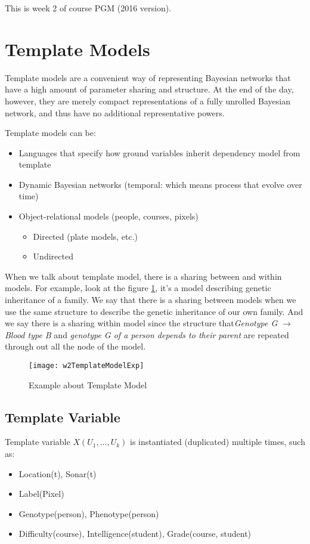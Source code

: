 This is week 2 of course PGM (2016 version). 

\section{Template Models}
Template models are a convenient way of representing Bayesian networks that have a high amount of parameter sharing and structure. At the end of the day, however, they are merely compact representations of a fully unrolled Bayesian network, and thus have no additional representative powers.

Template models can be:
\begin{itemize}
	\item Languages that specify how ground variables inherit dependency model from template
	\item Dynamic Bayesian networks (temporal: which means process that evolve over time)
	\item Object-relational models (people, courses, pixels)
	\begin{itemize}
		\item Directed (plate models, etc.)
		\item Undirected
	\end{itemize}
\end{itemize}

When we talk about template model, there is a sharing between and within models. For example, look at the figure \ref{w2TemplateModelExp}, it's a model describing genetic inheritance of a family. We say that there is a sharing between models when we use the same structure to describe the genetic inheritance of our own family. And we say there is a sharing within model since the structure that\textit{Genotype G $\rightarrow$ Blood type B} and \textit{genotype G of a person depends to their parent} are repeated through out all the node of the model.

\begin{figure}[!ht]
	\centering
	\texttt{[image: w2TemplateModelExp]}
	\caption{Example about Template Model}
	\label{w2TemplateModelExp}
\end{figure}

\subsection{Template Variable}
Template variable $X(U_1,...,U_k)$ is instantiated (duplicated) multiple times, such as:
\begin{itemize}
	\item Location(t), Sonar(t)
	\item Label(Pixel)
	\item Genotype(person), Phenotype(person)
	\item Difficulty(course), Intelligence(student), Grade(course, student)
\end{itemize}


